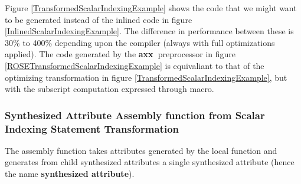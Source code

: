 \documentclass[10pt]{article}
\newcommand{\axx}{{\bf axx\ }}
\begin{document}
   Figure \ref{TransformedScalarIndexingExample} shows the code that we might want to be generated instead of
the inlined code in figure \ref{InlinedScalarIndexingExample}.  The difference in performance between these is 
30\% to 400\% depending upon the compiler (always with full optimizations applied).  The code generated
by the \axx preprocessor in figure \ref{ROSETransformedScalarIndexingExample} is equivaliant to that of 
the optimizing transformation in figure \ref{TransformedScalarIndexingExample}, but with the subscript 
computation expressed through macro.



\subsubsection{Synthesized Attribute Assembly function from Scalar Indexing Statement Transformation}

The assembly function takes attributes generated by the local function and generates from child
synthesized attributes a single synthesized attribute (hence the name {\bf synthesized attribute}).

\vspace{0.5in}
\end{document}
